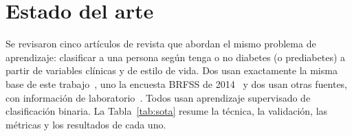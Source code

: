 \documentclass[journal]{IEEEtran}
\begin{document}
\section{Estado del arte}\label{sec:sota}
Se revisaron cinco artículos de revista que abordan el mismo problema de aprendizaje: clasificar a una persona según tenga o no diabetes (o prediabetes) a partir de variables clínicas y de estilo de vida. Dos usan exactamente la misma base de este trabajo~\cite{ren2024,majcherek2025}, uno la encuesta BRFSS de 2014~\cite{xie2019} y dos usan otras fuentes, con información de laboratorio~\cite{dinh2019,zou2018}. Todos usan aprendizaje supervisado de clasificación binaria. La Tabla~\ref{tab:sota} resume la técnica, la validación, las métricas y los resultados de cada uno.
\end{document}
